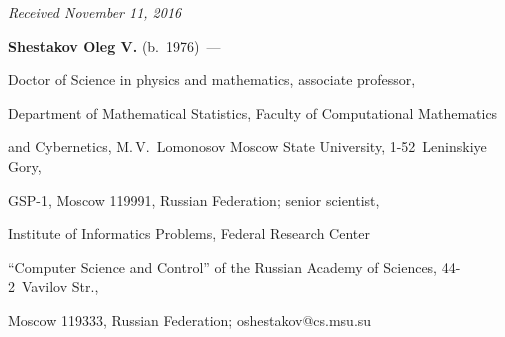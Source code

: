 \vspace*{-3pt}



\hfill{\small\textit{Received November 11, 2016}}



\vspace*{-12pt}



\Contrl



\noindent

\textbf{Shestakov Oleg V.} (b.\ 1976)~--- 

Doctor of Science in physics and mathematics, associate professor, 

Department of Mathematical Statistics, Faculty of Computational Mathematics 

and Cybernetics, M.\,V.~Lomonosov Moscow State University, 1-52~Leninskiye Gory,

 GSP-1, Moscow 119991, Russian Federation; senior scientist, 

 Institute of Informatics Problems, Federal Research Center 

 ``Computer Science and Control'' of the Russian Academy of Sciences, 44-2~Vavilov Str., 

 Moscow 119333, Russian Federation; \mbox{oshestakov@cs.msu.su}

\label{end\stat}





\renewcommand{\bibname}{\protect\rm Литература} 

